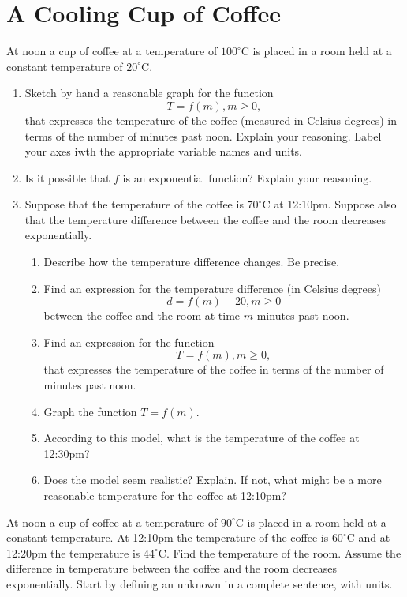\documentclass{ximera}
\begin{document}
\section{A Cooling Cup of Coffee}
\begin{question} \label{E5g4hgy344}
At noon a cup of coffee at a temperature of $100^\circ$C is placed in a room held at a constant temperature of $20^\circ$C.

\begin{enumerate}
\item Sketch by hand a reasonable graph for the function
\[
 T = f(m) , m\geq 0 ,
\]
that expresses the temperature of the coffee (measured in Celsius degrees) in terms of the number of minutes past noon. Explain your reasoning. Label your axes iwth the appropriate variable names and units.

\item Is it possible that $f$ is an exponential function? Explain your reasoning.

\item Suppose that the temperature of the coffee is $70^\circ$C at 12:10pm. Suppose also that the temperature difference between the coffee and the room decreases exponentially.

\begin{enumerate}

\item Describe how the temperature difference changes. Be precise.

\item Find an expression for the temperature difference (in Celsius degrees)
\[
    d =  f(m) - 20 , m\geq 0
\]
between the coffee and the room at time $m$ minutes past noon.

\item Find an expression for  the function
\[
 T = f(m) , m\geq 0 ,
\]
that expresses the temperature of the coffee in terms of the number of minutes past noon.

\item Graph the function $T=f(m)$.

\item According to this model, what is the temperature of the coffee at 12:30pm?

\item Does the model seem realistic? Explain. If not, what might be a more reasonable temperature for the coffee at 12:10pm?

\end{enumerate}
\end{enumerate}
\end{question}

\begin{question} \label{QPfmerer4z}
At noon a cup of coffee at a temperature of $90^\circ$C is placed in a room held at a constant temperature. At 12:10pm the temperature of the coffee is $60^\circ$C and at 12:20pm the temperature is $44^\circ$C. Find the temperature of the room. Assume the difference in temperature between the coffee and the room decreases exponentially. Start by defining an unknown in a complete sentence, with units.
\end{question}
\end{document}
